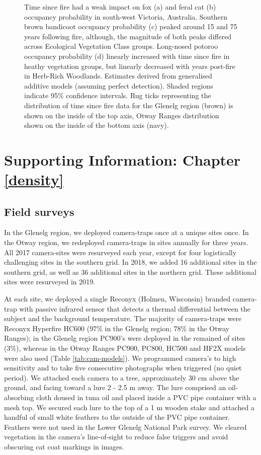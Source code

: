 \documentclass[11pt,a4paper,titlepage,twoside,openright]{style/unimelbthesis}
\begin{document}
\begin{mainmatter}
\begin{figure}
{}

\caption{Time since fire had a weak impact on fox (a) and feral cat (b) occupancy probability in south-west Victoria, Australia. Southern brown bandicoot occupancy probability (c) peaked around 15 and 75 years following fire, although, the magnitude of both peaks differed across Ecological Vegetation Class groups. Long-nosed potoroo occupancy probability (d) linearly increased with time since fire in heathy vegetation groups, but linearly decreased with years post-fire in Herb-Rich Woodlands. Estimates derived from generalised additive models (assuming perfect detection). Shaded regions indicate 95\% confidence intervals. Rug ticks representing the distribution of time since fire data for the Glenelg region (brown) is shown on the inside of the top axis, Otway Ranges distribution shown on the inside of the bottom axis (navy).}\label{fig:occ-tsf}
\end{figure}
\hypertarget{density-app}{%
\chapter{Supporting Information: Chapter \ref{density}}\label{density-app}}

\newpage

\hypertarget{density-app-field}{%
\section{Field surveys}\label{density-app-field}}

In the Glenelg region, we deployed camera-traps once at a unique sites once. In the Otway region, we redeployed camera-traps in sites annually for three years. All 2017 camera-sites were resurveyed each year, except for four logistically challenging sites in the southern grid. In 2018, we added 16 additional sites in the southern grid, as well as 36 additional sites in the northern grid. These additional sites were resurveyed in 2019.

At each site, we deployed a single Reconyx (Holmen, Wisconsin) branded camera-trap with passive infrared sensor that detects a thermal differential between the subject and the background temperature. The majority of camera-traps were Reconyx Hyperfire HC600 (97\% in the Glenelg region; 78\% in the Otway Ranges); in the Glenelg region PC900's were deployed in the remained of sites (3\%), whereas in the Otway Ranges PC900, PC800, HC500 and HF2X models were also used (Table \ref{tab:cam-models}). We programmed camera's to high sensitivity and to take five consecutive photographs when triggered (no quiet period). We attached each camera to a tree, approximately 30 cm above the ground, and facing toward a lure 2 - 2.5 m away. The lure comprised an oil-absorbing cloth doused in tuna oil and placed inside a PVC pipe container with a mesh top. We secured each lure to the top of a 1 m wooden stake and attached a handful of small white feathers to the outside of the PVC pipe container. Feathers were not used in the Lower Glenelg National Park survey. We cleared vegetation in the camera's line-of-sight to reduce false triggers and avoid obscuring cat coat markings in images.


\end{mainmatter}
\end{document}
